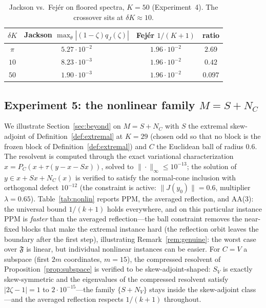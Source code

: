 \documentclass[11pt]{article}
\theoremstyle{definition}
\theoremstyle{remark}
\newcommand{\norm}[1]{\| #1 \|}
\newcommand{\abs}[1]{| #1 |}
\begin{document}
\begin{table}[htbp]
\centering\small
\caption{Jackson vs.\ Fej\'er on floored spectra, $K=50$
(Experiment~4). The crossover sits at $\delta K\approx10$.}
\label{tab:jackson}
\begin{tabular}{cccc}
\toprule
$\delta K$ & Jackson $\max_\theta\abs{(1-\zeta)q_J(\zeta)}$ &
Fej\'er $1/(K+1)$ & ratio\\
\midrule
$\pi$ & $5.27\cdot10^{-2}$ & $1.96\cdot10^{-2}$ & $2.69$\\
$10$ & $8.23\cdot10^{-3}$ & $1.96\cdot10^{-2}$ & $0.42$\\
$50$ & $1.90\cdot10^{-3}$ & $1.96\cdot10^{-2}$ & $0.097$\\
\bottomrule
\end{tabular}
\end{table}

\subsection{Experiment 5: the nonlinear family $M=S+N_C$}\label{sec:expNonlin}

We illustrate Section~\ref{sec:beyond} on $M=S+N_C$ with $S$ the extremal
skew-adjoint of Definition~\ref{def:extremal} at $K=29$ (chosen odd so
that no block is the frozen block of Definition~\ref{def:extremal}) and
$C$ the Euclidean ball of radius $0.6$. The resolvent is computed through
the exact variational characterization $x=P_C(x+\tau(y-x-Sx))$, solved to
$\norm{\cdot}_\infty\le10^{-13}$; the solution of $y\in x+Sx+N_C(x)$ is
verified to satisfy the normal-cone inclusion with orthogonal defect
$10^{-12}$ (the constraint is active: $\norm{J(y_0)}=0.6$, multiplier
$\lambda=0.65$). Table~\ref{tab:nonlin} reports PPM, the averaged
reflection, and AA(3): the universal bound $1/(k+1)$ holds everywhere, and
on this particular instance PPM is \emph{faster} than the averaged
reflection---the ball constraint removes the near-fixed blocks that make
the extremal instance hard (the reflection orbit leaves the boundary after
the first step), illustrating Remark~\ref{rem:genuine}: the worst case
over $\mathfrak F$ is linear, but individual nonlinear instances can be
easier. For $C=V$ a subspace (first $2m$ coordinates, $m=15$), the
compressed resolvent of Proposition~\ref{prop:subspace} is verified to be
skew-adjoint-shaped: $S_V$ is exactly skew-symmetric and the eigenvalues
of the compressed resolvent satisfy $\abs{2\zeta-1}=1$ to
$2\cdot10^{-15}$---the family $\{S+N_V\}$ stays inside the skew-adjoint
class---and the averaged reflection respects $1/(k+1)$ throughout.
\end{document}
